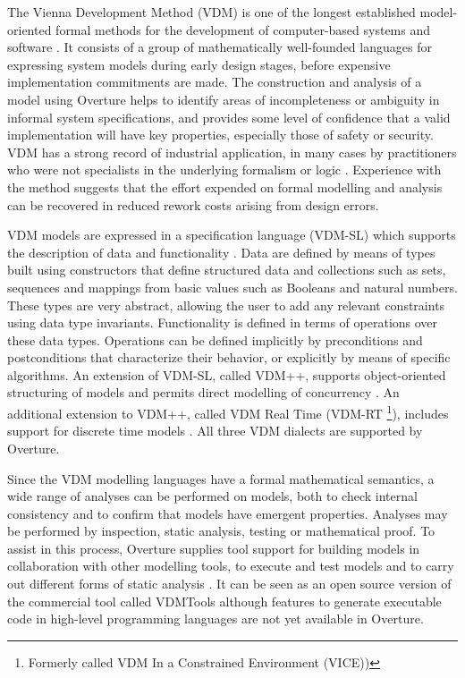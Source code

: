 \documentclass{overturerepchap}
\begin{document}
The Vienna Development Method (VDM) is one of the longest established
model-oriented formal methods for the development of computer-based
systems and software
\cite{Bjorner&78,Jones90a,Fitzgerald&08c}. It consists of a
group of mathematically well-founded languages for expressing system
models during early design stages, before expensive implementation
commitments are made. The construction and analysis of a model using
Overture helps to identify areas of incompleteness or ambiguity in
informal system specifications, and provides some level of confidence
that a valid implementation will have key properties, especially those
of safety or security. VDM has a strong record of industrial
application, in many cases by practitioners who were not specialists in
the underlying formalism or logic
\cite{Larsen&95b,Clement&99,Kurita&09}. Experience with the method
suggests that the effort expended on formal modelling and analysis can
be recovered in reduced rework costs arising from design errors.

VDM models are expressed in a specification language (VDM-SL) which
supports the description of data and functionality
\cite{ISOVDM96a,Fitzgerald&98b,Fitzgerald&09}. Data are defined by
means of types built using constructors that define structured data
and collections such as sets, sequences and mappings from basic values
such as Booleans and natural numbers. These types are very abstract, allowing
the user to add any relevant constraints using data type
invariants. Functionality is defined in terms of operations over these
data types. Operations can be defined implicitly by preconditions and
postconditions that characterize their behavior, or explicitly by
means of specific algorithms. An extension of VDM-SL, called VDM++,
supports object-oriented structuring of models and permits direct
modelling of concurrency \cite{Fitzgerald&05}. An additional extension
to VDM++, called VDM Real Time (VDM-RT \footnote{Formerly called VDM In a
Constrained Environment (VICE))}), includes support for discrete
time models \cite{Mukherjee&00,Verhoef&06b}. All
three VDM dialects are supported by Overture.

Since the VDM modelling languages have a formal mathematical semantics,
a wide range of analyses can be performed on models, both to check
internal consistency and to confirm that models have emergent
properties. Analyses may be performed by inspection, static analysis,
testing or mathematical proof. To assist in this process, Overture
supplies tool support for building models in collaboration with other
modelling tools, to execute and test models and to carry out different
forms of static analysis \cite{Larsen&10a}. It can be seen as an open
source version of the commercial tool called VDMTools
\cite{Elmstrom&94,Larsen01,Fitzgerald&08a} although features to
generate executable code in high-level programming languages are
not yet available in Overture.
\end{document}
